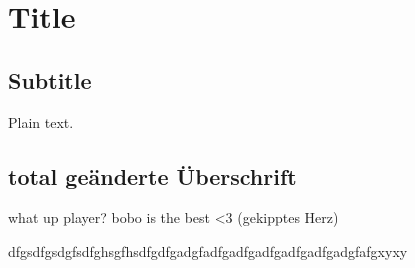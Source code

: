 \documentclass{article}
\begin{document}
\section{Title}

\subsection{Subtitle}

Plain text.

\subsection{total geänderte Überschrift}

what up player?
bobo is the best <3 (gekipptes Herz)



dfgsdfgsdgfsdfghsgfhsdfgdfgadgfadfgadfgadfgadfgadfgadgfafgxyxy
\end{document}
